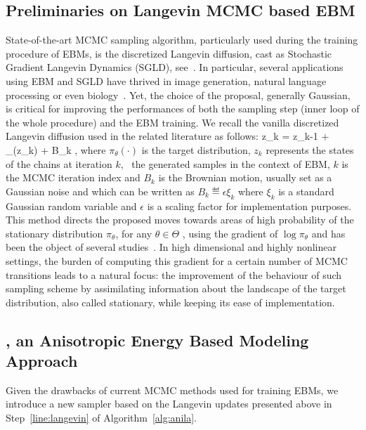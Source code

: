 \documentclass[letterpaper]{article} %
\begin{document}
\subsection{Preliminaries on Langevin MCMC based EBM}
State-of-the-art MCMC sampling algorithm, particularly used during the training procedure of EBMs, is the discretized Langevin diffusion, cast as Stochastic Gradient Langevin Dynamics (SGLD), see~\citet{welling2011bayesian}.
In particular, several applications using EBM and SGLD have thrived in image generation, natural language processing or even biology~\cite{du2019energy}.
Yet, the choice of the proposal, generally Gaussian, is critical for improving the performances of both the sampling step (inner loop of the whole procedure) and the EBM training.
We recall the vanilla discretized Langevin diffusion used in the related literature as follows:
\beq\notag
z_k = z_{k-1} +  \nabla \log \pi_\theta(z_k) + \sqrt{\gamma} B_k \eqsp,
\eeq
where $\pi_\theta(\cdot)$ is the target distribution, $z_k$ represents the states of the chains at iteration $k$, \ie\ the generated samples in the context of EBM, $k$ is the MCMC iteration index and $B_k$ is the Brownian motion, usually set as a Gaussian noise and which can be written as $B_k \eqdef \epsilon \xi_k$ where $\xi_k$ is a standard Gaussian random variable and $\epsilon$ is a scaling factor for implementation purposes.
This method directs the proposed moves towards areas of high probability of the stationary distribution $\pi_\theta$, for any $\theta \in \Theta$ , using the gradient of $\log \pi_{\theta}$ and has been the object of several studies~\cite{girolami2011riemann,cotter2013mcmc}.
In high dimensional and highly nonlinear settings, the burden of computing this gradient for a certain number of MCMC transitions leads to a natural focus: the improvement of the behaviour of such sampling scheme by assimilating information about the landscape of the target distribution, also called stationary, while keeping its ease of implementation.

\subsection{\algo, an Anisotropic Energy Based Modeling Approach}

Given the drawbacks of current MCMC methods used for training EBMs, we introduce a new sampler based on the Langevin updates presented above in Step~\ref{line:langevin} of Algorithm~\ref{alg:anila}.
\end{document}
